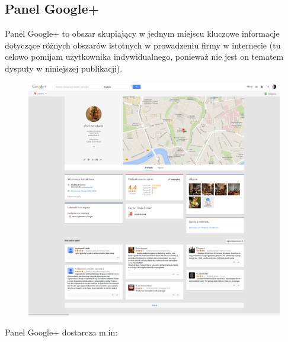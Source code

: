 
\subsection{Panel Google+}
Panel Google+ to obszar skupiający w jednym miejscu kluczowe informacje dotyczące różnych obszarów istotnych w prowadzeniu firmy w internecie (tu celowo pomijam użytkownika indywidualnego, ponieważ nie jest on tematem dysputy w niniejszej publikacji).\\




\begin{figure}[!h]
\centering
    \scalebox{0.21}
    {
        \includegraphics{images/pod-aniolami-google-plus.png}
    }
    \label{fig:sample-google-plus-company-profile-page}
\end{figure}


Panel Google+ dostarcza m.in:

